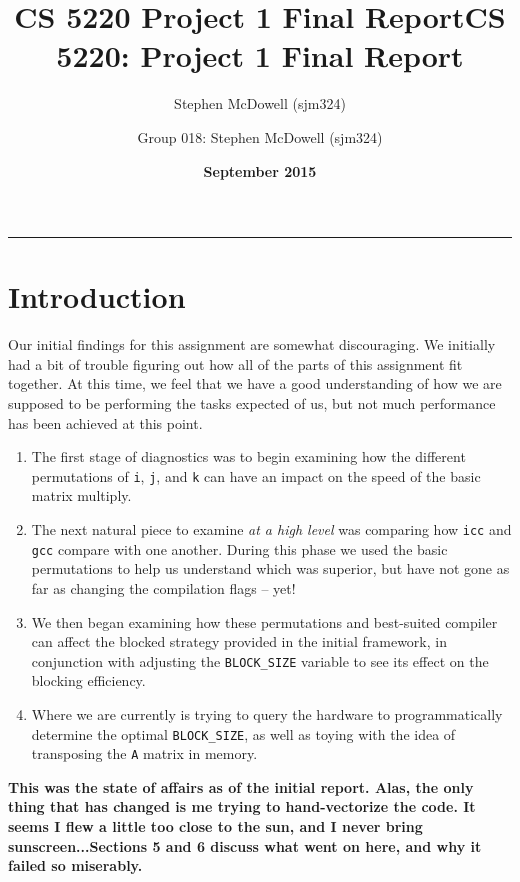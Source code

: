 \documentclass[11pt]{article}
\title{\textbf{CS 5220 Project 1 Final Report}}
\author{Stephen McDowell (sjm324)}
\date{\textbf{September 2015}}
\title{CS 5220: Project 1 Final Report}
\author{Group 018: Stephen McDowell (sjm324)}
\makeatletter
\renewcommand{\maketitle}{\bgroup\setlength{\parindent}{0pt}
\begin{flushleft}
  {\Large \textsc{\@title}}\newline
  \textsc{\@author}
  \rule{\textwidth}{1pt}
\end{flushleft}\egroup
}
\makeatother
\begin{document}
\thispagestyle{empty}
\maketitle

\section{Introduction}

Our initial findings for this assignment are somewhat discouraging.  We initially had a bit of trouble figuring out how all of the parts of this assignment fit together.  At this time, we feel that we have a good understanding of how we are supposed to be performing the tasks expected of us, but not much performance has been achieved at this point.

\begin{enumerate}
    \item The first stage of diagnostics was to begin examining how the different permutations of \texttt{i}, \texttt{j}, and \texttt{k} can have an impact on the speed of the basic matrix multiply.

    \item The next natural piece to examine \emph{at a high level} was comparing how \texttt{icc} and \texttt{gcc} compare with one another.  During this phase we used the basic permutations to help us understand which was superior, but have not gone as far as changing the compilation flags -- yet!

    \item We then began examining how these permutations and best-suited compiler can affect the blocked strategy provided in the initial framework, in conjunction with adjusting the \texttt{BLOCK\_SIZE} variable to see its effect on the blocking efficiency.

    \item Where we are currently is trying to query the hardware to programmatically determine the optimal \texttt{BLOCK\_SIZE}, as well as toying with the idea of transposing the \texttt{A} matrix in memory.
\end{enumerate}

\noindent \textbf{This was the state of affairs as of the initial report.  Alas, the only thing that has changed is me trying to hand-vectorize the code.  It seems I flew a little too close to the sun, and I never bring sunscreen...Sections 5 and 6 discuss what went on here, and why it failed so miserably.}
\end{document}
